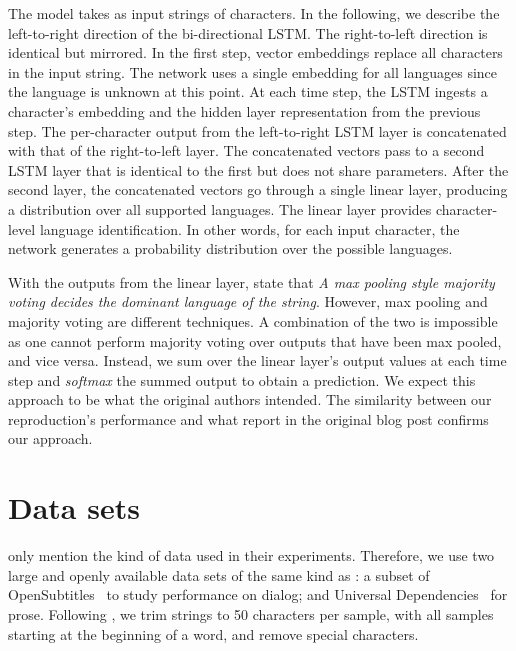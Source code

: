\documentclass[11pt,a4paper]{article}
\begin{document}
The model takes as input strings of characters. In the following, we describe the left-to-right direction of the bi-directional LSTM. The right-to-left direction is identical but mirrored. In the first step, vector embeddings replace all characters in the input string. The network uses a single embedding for all languages since the language is unknown at this point. At each time step, the LSTM ingests a character's embedding and the hidden layer representation from the previous step. The per-character output from the left-to-right LSTM layer is concatenated with that of the right-to-left layer. The concatenated vectors pass to a second LSTM layer that is identical to the first but does not share parameters. After the second layer, the concatenated vectors go through a single linear layer, producing a distribution over all supported languages. The linear layer provides character-level language identification. In other words, for each input character, the network generates a probability distribution over the possible languages.

With the outputs from the linear layer, \citet{apple} state that \emph{A max pooling style majority voting decides the dominant language of the string}. However, max pooling and majority voting are different techniques. A combination of the two is impossible as one cannot perform majority voting over outputs that have been max pooled, and vice versa. Instead, we sum over the linear layer's output values at each time step and \emph{softmax} the summed output to obtain a prediction. We expect this approach to be what the original authors intended. The similarity between our reproduction's performance and what \citeauthor{apple} report in the original blog post confirms our approach.

\section{Data sets}

 only mention the kind of data used in their experiments. Therefore, we use two large and openly available data sets of the same kind as \citeauthor{apple}: a subset of OpenSubtitles~\cite{lison2016opensubtitles2016} to study performance on dialog; and Universal Dependencies~\cite[UD, ][]{ud25} for prose. Following \citeauthor{apple}, we trim strings to 50 characters per sample, with all samples starting at the beginning of a word, and remove special characters.
\end{document}
